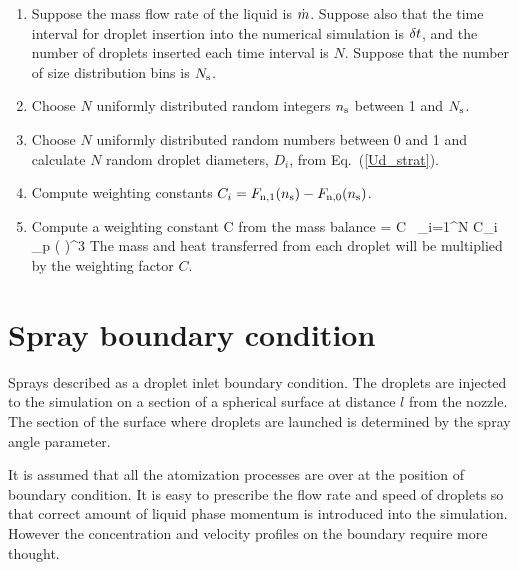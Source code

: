 \begin{enumerate}
\item Suppose the mass flow rate of the liquid is $\dot{m}$. Suppose also that the time interval for droplet insertion into the numerical simulation is $\delta t$, and the number of droplets inserted each time interval is $N$. Suppose that the number of size distribution bins is $N_{\rm s}$.
\item Choose $N$ uniformly distributed random integers $n_{\rm s}$ between 1 and $N_{\rm s}$.
\item Choose $N$ uniformly distributed random numbers between 0 and 1 and calculate $N$ random droplet diameters, $D_i$, from Eq.~(\ref{Ud_strat}).
\item Compute weighting constants $C_i = F_{\rm n,1}(n_{\rm s}) - F_{\rm n,0}(n_{\rm s})$.
\item Compute a weighting constant C from the mass balance
    \be \dm \; \dt = C \, \sum_{i=1}^N \; C_i \;  \pi \rho_{\rm p}
      \left(  \right)^3
    \ee
    The mass and heat transferred from each droplet will be multiplied by the weighting factor $C$.
\end{enumerate}

\section{Spray boundary condition}

Sprays described as a droplet inlet boundary condition. The droplets are
injected to the simulation on a section of a spherical surface at distance
$l$ from the nozzle. The section of the surface where droplets are launched is
determined by the spray angle parameter. 

It is assumed that all the atomization processes are over at the 
position of boundary condition. It is easy to prescribe the flow rate and speed of droplets so that correct amount of liquid phase momentum is introduced into the simulation. However the concentration and velocity profiles on the boundary require more thought. 

